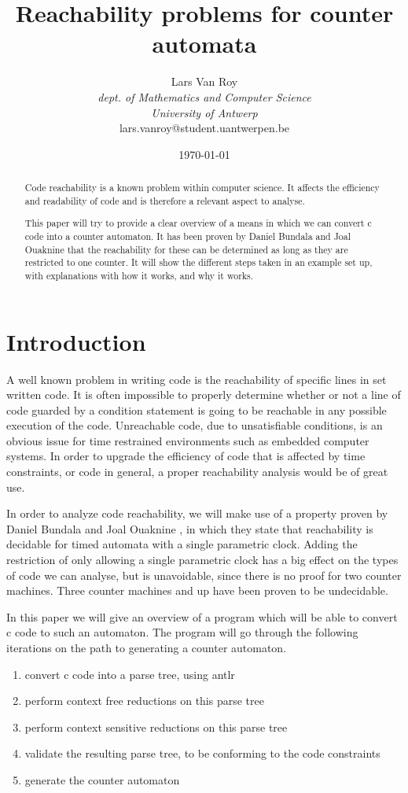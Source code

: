 \documentclass[12pt]{article}
\title{Reachability problems for counter automata}
\author{Lars Van Roy\\
\textit{dept. of Mathematics and Computer Science} \\
\textit{University of Antwerp}\\
lars.vanroy@student.uantwerpen.be}
\date{\today}
\begin{document}
\maketitle{}

\begin{abstract}
\noindent
\noindent
Code reachability is a known problem within computer science. It affects the efficiency and readability of code and is therefore a relevant aspect to analyse.

\noindent
This paper will try to provide a clear overview of a means in which we can convert c code into a counter automaton. It has been proven by Daniel Bundala and Joal Ouaknine that the reachability for these can be determined as long as they are restricted to one counter. It will show the different steps taken in an example set up, with explanations with how it works, and why it works.
\end{abstract}

\section{Introduction}
A well known problem in writing code is the reachability of specific lines in set written code. It is often impossible to properly determine whether or not a line of code guarded by a condition statement is going to be reachable in any possible execution of the code. Unreachable code, due to unsatisfiable conditions, is an obvious issue for time restrained environments such as embedded computer systems. In order to upgrade the efficiency of code that is affected by time constraints, or code in general, a proper reachability analysis would be of great use. \newpage

In order to analyze code reachability, we will make use of a property proven by Daniel Bundala and Joal Ouaknine \cite{danialandjoel}, in which they state that reachability is decidable for timed automata with a single parametric clock. Adding the restriction of only allowing a single parametric clock has a big effect on the types of code we can analyse, but is unavoidable, since there is no proof for two counter machines. Three counter machines and up have been proven to be undecidable.

In this paper we will give an overview of a program which will be able to convert c code to such an automaton. The program will go through the following iterations on the path to generating a counter automaton.

\begin{enumerate}
	\item convert c code into a parse tree, using antlr
	\item perform context free reductions on this parse tree
	\item perform context sensitive reductions on this parse tree
	\item validate the resulting parse tree, to be conforming to the code constraints
	\item generate the counter automaton
\end{enumerate}
\end{document}
